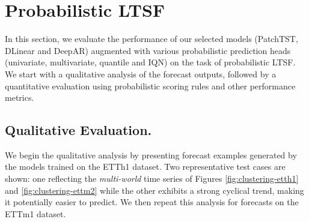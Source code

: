 \documentclass[a4paper,oneside,bibliography=totoc]{scrbook}
\begin{document}
\section{Probabilistic LTSF}
In this section, we evaluate the performance of our selected models (PatchTST, DLinear and DeepAR) augmented with various probabilistic prediction heads (univariate, multivariate, quantile and IQN) on the task of probabilistic LTSF. We start with a qualitative analysis of the forecast outputs, followed by a quantitative evaluation using probabilistic scoring rules and other performance metrics.

\subsection{Qualitative Evaluation.}
We begin the qualitative analysis by presenting forecast examples generated by the models trained on the ETTh1 dataset. Two representative test cases are shown: one reflecting the \textit{multi-world} time series of Figures \ref{fig:clustering-etth1} and \ref{fig:clustering-ettm2} while the other exhibits a strong cyclical trend, making it potentially easier to predict. We then repeat this analysis for forecasts on the ETTm1 dataset.
\end{document}
